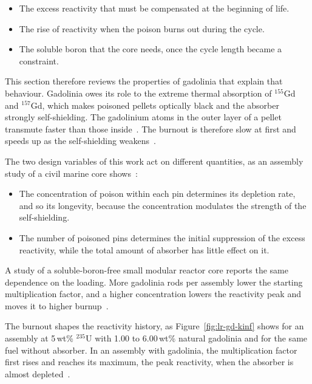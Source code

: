 \begin{itemize}
  \item The excess reactivity that must be compensated at the beginning of
        life.

  \item The rise of reactivity when the poison burns out during the
        cycle.

  \item The soluble boron that the core needs, once the cycle length
        became a constraint.
\end{itemize}

This section therefore reviews the properties of gadolinia that explain
that behaviour. Gadolinia owes its role to the extreme thermal absorption of $^{155}$Gd
and $^{157}$Gd, which makes poisoned pellets optically black and the
absorber strongly self-shielding. The gadolinium atoms in the outer layer
of a pellet transmute faster than those inside~\cite{gd_enriched_2021}.
The burnout is therefore slow at first and speeds up as the
self-shielding weakens~\cite{duderstadt_hamilton_1976}.

The two design variables of this work act on different quantities, as an
assembly study of a civil marine core shows~\cite{alam_partI_2019}:

\begin{itemize}
  \item The concentration of poison within each pin determines its depletion
        rate, and so its longevity, because the concentration modulates
        the strength of the self-shielding.

  \item The number of poisoned pins determines the initial suppression of the
        excess reactivity, while the total amount of absorber has little
        effect on it.
\end{itemize}

A study of a soluble-boron-free small modular reactor core reports the
same dependence on the loading. More gadolinia rods per assembly lower the starting
multiplication factor, and a higher concentration lowers the reactivity
peak and moves it to higher burnup~\cite{song_sanchez_2026}.

The burnout shapes the reactivity history, as
Figure~\ref{fig:lr-gd-kinf} shows for an assembly at 5\,wt\%
$^{235}$U with 1.00 to 6.00\,wt\% natural gadolinia and for the same
fuel without absorber. In an assembly with gadolinia,
the multiplication factor first rises and reaches its maximum, the peak
reactivity, when the absorber is almost depleted~\cite{gd_enriched_2021}.

